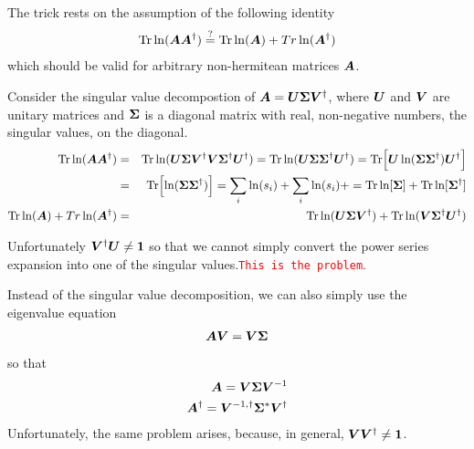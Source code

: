 \documentclass[11pt,a4paper]{report}
\newcommand{\petertt}[1]{\textcolor{red}{\texttt{#1}}}
\begin{document}
The trick rests on the assumption of the following identity
\begin{eqnarray}
\mathrm{Tr}\ln(\bm{A}\bm{A}^\dagger)\stackrel{?}{=}
\mathrm{Tr}\ln(\bm{A})+Tr\ln(\bm{A}^\dagger)
\end{eqnarray}
which should be valid for arbitrary non-hermitean matrices $\bm{A}$.

Consider the singular value decompostion of
$\bm{A}=\bm{U}\bm{\Sigma}\bm{V}^\dagger$, where $\bm{U}$ and $\bm{V}$ are
unitary matrices and $\bm{\Sigma}$ is a diagonal matrix with real,
non-negative numbers, the singular values, on the diagonal.
\begin{eqnarray}
\mathrm{Tr}\ln(\bm{A}\bm{A}^\dagger)
&=&\mathrm{Tr}\ln(\bm{U}\bm{\Sigma}\bm{V}^\dagger
\bm{V}\bm{\Sigma}^\dagger\bm{U}^\dagger)
=\mathrm{Tr}\ln(\bm{U}\bm{\Sigma}\bm{\Sigma}^\dagger\bm{U}^\dagger)
=\mathrm{Tr}\Bigl[\bm{U}\ln(\bm{\Sigma}\bm{\Sigma}^\dagger)\bm{U}^\dagger\Bigr]
\nonumber\\
&=&\mathrm{Tr}\Bigl[\ln(\bm{\Sigma}\bm{\Sigma}^\dagger)\Bigr]
=\sum_i \ln(s_i)+\sum_i \ln(s_i)+
=\mathrm{Tr}\ln[\bm{\Sigma}]+\mathrm{Tr}\ln[\bm{\Sigma}^\dagger]
\nonumber\\
\mathrm{Tr}\ln(\bm{A})+Tr\ln(\bm{A}^\dagger)
&=&\mathrm{Tr}\ln(\bm{U}\bm{\Sigma}\bm{V}^\dagger)
+\mathrm{Tr}\ln(\bm{V}\bm{\Sigma}^\dagger\bm{U}^\dagger)
\end{eqnarray}

Unfortunately $\bm{V}^\dagger\bm{U}\neq\bm{1}$ so that we cannot
simply convert the power series expansion into one of the singular
values.\petertt{This is the problem}.


Instead of the singular value decomposition, we can also simply use the
eigenvalue equation
\begin{eqnarray}
\bm{A}\bm{V}=\bm{V}\bm{\Sigma}
\end{eqnarray}
so that
\begin{eqnarray}
\bm{A}=\bm{V}\bm{\Sigma}\bm{V}^{-1}
\nonumber\\
\bm{A}^\dagger=\bm{V}^{-1,\dagger}\bm{\Sigma}^*\bm{V}^{\dagger}
\end{eqnarray}
Unfortunately, the same problem arises, because, in general,
$\bm{V}\bm{V}^\dagger\neq\bm{1}$.

\end{document}
